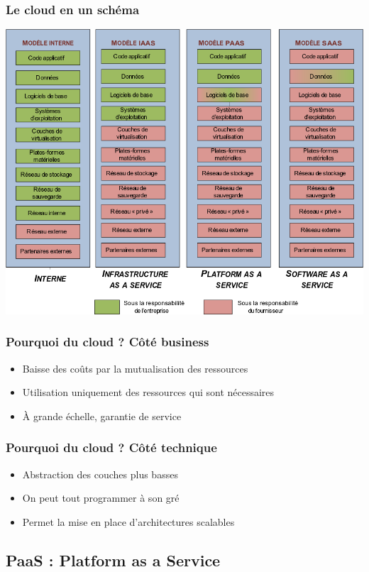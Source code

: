   \begin{frame}
    \frametitle{Le cloud en un schéma}
    \includegraphics[width=\linewidth,height=\textheight]{images/cloud.png}
  \end{frame}

  \begin{frame}
    \frametitle{Pourquoi du cloud ? Côté business}
    \begin{itemize}
      \item Baisse des coûts par la mutualisation des ressources
      \item Utilisation uniquement des ressources qui sont nécessaires
      \item À grande échelle, garantie de service
    \end{itemize}
  \end{frame}

  \begin{frame}
    \frametitle{Pourquoi du cloud ? Côté technique}
    \begin{itemize}
      \item Abstraction des couches plus basses
      \item On peut tout programmer à son gré
      \item Permet la mise en place d'architectures scalables
    \end{itemize}
  \end{frame}

  \subsection[PaaS]{PaaS : Platform as a Service}

